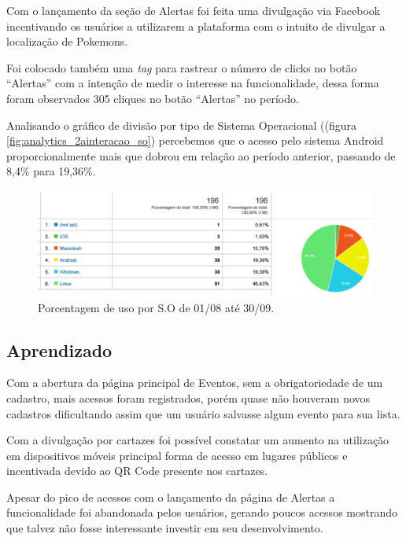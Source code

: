 \par Com o lançamento da seção de Alertas foi feita uma divulgação via Facebook incentivando os usuários a utilizarem a plataforma com o intuito de divulgar a localização de Pokemons.
\par Foi colocado também uma \emph{tag} para rastrear o número de clicks no botão ``Alertas'' com a intenção de medir o interesse na funcionalidade, dessa forma foram observados 305 cliques no botão ``Alertas'' no período.

\par Analisando o gráfico de divisão por tipo de Sistema Operacional ((figura \ref{fig:analytics_2ainteracao_so}) percebemos que o acesso pelo sistema Android proporcionalmente mais que dobrou em relação ao período anterior, passando de 8,4\% para 19,36\%.

\begin{figure}[htb]
\centering
\includegraphics[width=15cm]{figuras/analytics_2ainteracao_so}
\caption{\label{fig:analytics_1interacao_so} Porcentagem de uso por S.O de 01/08 até 30/09.}
\end{figure}

\subsection{Aprendizado}

\par Com a abertura da página principal de Eventos, sem a obrigatoriedade de um cadastro, mais acessos foram registrados, porém quase não houveram novos cadastros dificultando assim que um usuário salvasse algum evento para sua lista.

\par Com a divulgação por cartazes foi possível constatar um aumento na utilização em dispositivos móveis principal forma de acesso em lugares públicos e incentivada devido ao QR Code presente nos cartazes.

\par Apesar do pico de acessos com o lançamento da página de Alertas a funcionalidade foi abandonada pelos usuários, gerando poucos acessos mostrando que talvez não fosse interessante investir em seu desenvolvimento.

